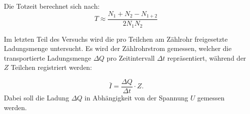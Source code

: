 Die Totzeit berechnet sich nach:
\begin{equation}
\label{eq:totzeit}
T \approx \frac{N_1 + N_2 - N_{1+2}}{2N_1 N_2}
\end{equation}


Im letzten Teil des Versuchs wird die pro Teilchen am Zählrohr freigesetzte Ladungsmenge untersucht. Es wird der Zählrohrstrom gemessen, welcher die transportierte Ladungsmenge $\Delta Q$ pro Zeitintervall $\Delta t$ repräsentiert, während der $Z$ Teilchen registriert werden:

\begin{equation}
\label{eq:ladung}
\bar{I} = \frac{\Delta Q}{\Delta t}\cdot Z.
\end{equation}
Dabei soll die Ladung $\Delta Q$ in Abhängigkeit von der Spannung $U$ gemessen werden.